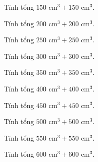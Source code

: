 
\begin{ex}
  Tính tổng $150\text{ cm}^3 + 150\text{ cm}^3$.
\end{ex}

\begin{ex}
  Tính tổng $200\text{ cm}^3 + 200\text{ cm}^3$.
\end{ex}

\begin{ex}
  Tính tổng $250\text{ cm}^3 + 250\text{ cm}^3$.
\end{ex}

\begin{ex}
  Tính tổng $300\text{ cm}^3 + 300\text{ cm}^3$.
\end{ex}

\begin{ex}
  Tính tổng $350\text{ cm}^3 + 350\text{ cm}^3$.
\end{ex}

\begin{ex}
  Tính tổng $400\text{ cm}^3 + 400\text{ cm}^3$.
\end{ex}

\begin{ex}
  Tính tổng $450\text{ cm}^3 + 450\text{ cm}^3$.
\end{ex}

\begin{ex}
  Tính tổng $500\text{ cm}^3 + 500\text{ cm}^3$.
\end{ex}

\begin{ex}
  Tính tổng $550\text{ cm}^3 + 550\text{ cm}^3$.
\end{ex}

\begin{ex}
  Tính tổng $600\text{ cm}^3 + 600\text{ cm}^3$.
\end{ex}

